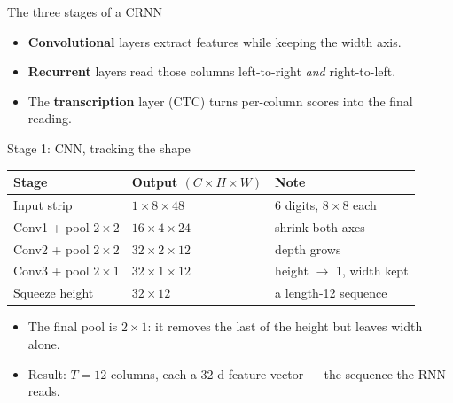 \documentclass[10pt,aspectratio=169]{beamer}
\begin{document}
\begin{frame}{The three stages of a CRNN}
  \begin{center}
  \end{center}
  \begin{itemize}
    \item \textbf{Convolutional} layers extract features while keeping the width axis.
    \item \textbf{Recurrent} layers read those columns left-to-right \emph{and} right-to-left.
    \item The \textbf{transcription} layer (CTC) turns per-column scores into the final reading.
  \end{itemize}
\end{frame}

\begin{frame}{Stage 1: CNN, tracking the shape}
  \begin{center}
  \begin{tabular}{@{}lll@{}}
    \toprule
    \textbf{Stage} & \textbf{Output} $(C\times H\times W)$ & \textbf{Note} \\
    \midrule
    Input strip           & $1\times 8\times 48$   & 6 digits, $8{\times}8$ each \\
    Conv1 + pool $2{\times}2$ & $16\times 4\times 24$ & shrink both axes \\
    Conv2 + pool $2{\times}2$ & $32\times 2\times 12$ & depth grows \\
    Conv3 + pool $2{\times}1$ & $32\times 1\times 12$ & \alert{height $\to$ 1, width kept} \\
    Squeeze height        & $32\times 12$          & a length-12 sequence \\
    \bottomrule
  \end{tabular}
  \end{center}
  \begin{itemize}
    \item The final pool is $2\times1$: it removes the last of the height but leaves width alone.
    \item Result: $T{=}12$ columns, each a 32-d feature vector --- the sequence the RNN reads.
  \end{itemize}
\end{frame}
\end{document}

